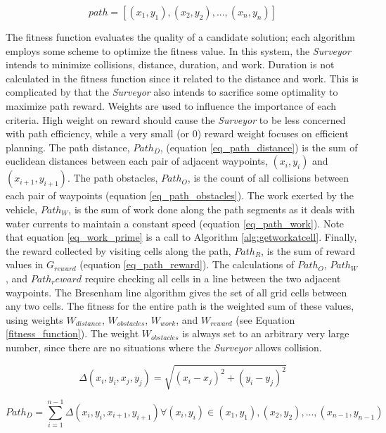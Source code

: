 \documentclass{tamuccthesis}
\begin{document}
\begin{equation}
path = [ (x_{1}, y_{1}), (x_{2}, y_{2}), ..., (x_{n}, y_{n}) ]
\label{solution_path}
\end{equation}

The fitness function evaluates the quality of a candidate solution; each algorithm employs some scheme to optimize the fitness value. In this system, the \textit{Surveyor} intends to minimize collisions, distance, duration, and work. Duration is not calculated in the fitness function since it related to the distance and work. This is complicated by that the \textit{Surveyor} also intends to sacrifice some optimality to maximize path reward. Weights are used to influence the importance of each criteria. High weight on reward should cause the \textit{Surveyor} to be less concerned with path efficiency, while a very small (or 0) reward weight focuses on efficient planning. The path distance, $Path_D$, (equation \ref{eq_path_distance}) is the sum of euclidean distances between each pair of adjacent waypoints, $(x_{i}, y_{i})$ and $(x_{i+1}, y_{i+1})$. The path obstacles, $Path_O$, is the count of all collisions between each pair of waypoints (equation \ref{eq_path_obstacles}). The work exerted by the vehicle, $Path_W$, is the sum of work done along the path segments as it deals with water currents to maintain a constant speed (equation \ref{eq_path_work}). Note that equation \ref{eq_work_prime} is a call to Algorithm \ref{alg:getworkatcell}. Finally, the reward collected by visiting cells along the path, $Path_R$, is the sum of reward values in $G_{reward}$ (equation \ref{eq_path_reward}). The calculations of $Path_O$, $Path_W$, and $Path_reward$ require checking all cells in a line between the two adjacent waypoints. The Bresenham line algorithm \cite{bresenham:1965} gives the set of all grid cells between any two cells. The fitness for the entire path is the weighted sum of these values, using weights $W_{distance}$, $W_{obstacles}$, $W_{work}$, and $W_{reward}$ (see Equation \ref{fitness_function}). The weight $W_{obstacles}$ is always set to an arbitrary very large number, since there are no situations where the \textit{Surveyor} allows collision. 

\begin{equation}
\Delta (x_{i}, y_{i}, x_{j}, y_{j}) = \sqrt{(x_{i} - x_{j})^2 + (y_{i} - y_{j})^2}
\label{eq_distance}
\end{equation}

\begin{equation}
Path_{D} = \sum_{i=1}^{n-1} \Delta (x_{i}, y_{i}, x_{i+1}, y_{i+1}) \forall (x_{i}, y_{i}) \in (x_{1}, y_{1}), (x_{2}, y_{2}), ..., (x_{n-1}, y_{n-1})
\label{eq_path_distance}
\end{equation}
\end{document}
